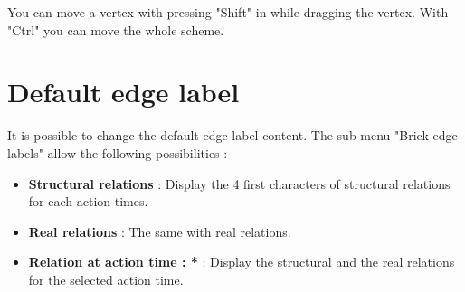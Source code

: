 
You can move a vertex with pressing "Shift" in while dragging the vertex. With "Ctrl" you can move the whole scheme.\\



\section{Default edge label}
It is possible to change the default edge label content. The sub-menu "Brick edge labels" allow the following possibilities : 
\begin{itemize}
\item \textbf{Structural relations} : Display the 4 first characters of structural relations for each action times.\\
\item \textbf{Real relations} : The same with real relations.\\
\item \textbf{Relation at action time : *} : Display the structural and the real relations for the selected action time.\\
\end{itemize}

